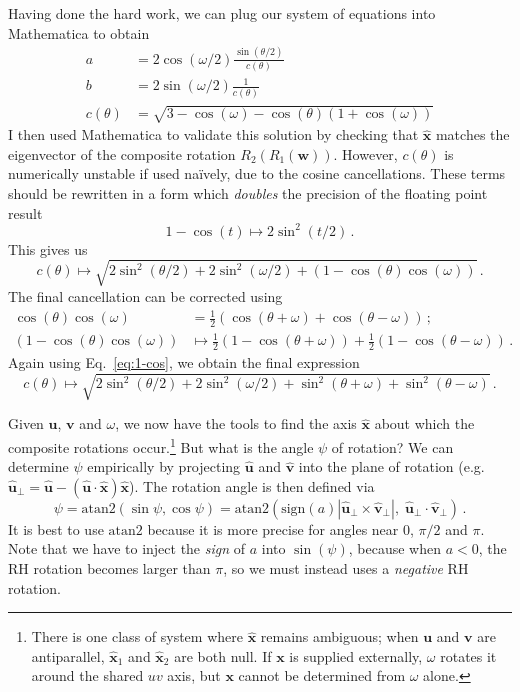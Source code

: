\documentclass{article}
\renewcommand{\vec}[1]{\boldsymbol{#1}}
\newcommand{\vecN}[1]{\vec{\hat{#1}}}
\newcommand{\ds}{^{}}
\newcommand{\abs}[1]{|#1|}
\newcommand{\ang}{\psi}
\newcommand{\vict}{\vec{w}}
\newcommand{\ax}{\vecN{x}}
\begin{document}
Having done the hard work, we can plug our system of equations into Mathematica to obtain
\begin{align}
	a & = 2\cos(\omega/2)\frac{\sin(\theta/2)}{c(\theta)}\\
	b & = 2\sin(\omega/2)\frac{1}{c(\theta)}\\
	c(\theta) & = \sqrt{3 - \cos(\omega) - \cos(\theta)(1+\cos(\omega))}
\end{align}
I then used Mathematica to validate this solution by checking that 
$\ax$ matches the eigenvector of the composite rotation $R_2\ds(R_1\ds(\vict))$.
However, $c(\theta)$ is numerically unstable if used na\"ively, 
due to the cosine cancellations. These terms should be rewritten 
in a form which \emph{doubles} the precision of the floating point result
\begin{equation}\label{eq:1-cos}
	1-\cos(t) \mapsto 2\sin^2(t/2)\,.
\end{equation}
This gives us
\begin{equation}
	c(\theta)\mapsto
	\sqrt{2\sin^2(\theta/2) + 2\sin^2(\omega/2) + (1 - \cos(\theta)\cos(\omega))}\,.
\end{equation}
The final cancellation can be corrected using
\begin{align}
	\cos(\theta)\cos(\omega) 
		& = \frac{1}{2}(\cos(\theta+\omega) + \cos(\theta-\omega))\,;\\
	(1 - \cos(\theta)\cos(\omega)) 
		&\mapsto \frac{1}{2}(1-\cos(\theta+\omega))
		 + \frac{1}{2}(1-\cos(\theta-\omega))\,.
\end{align}
Again using Eq.~\ref{eq:1-cos}, we obtain the final expression
\begin{equation}
	c(\theta)\mapsto
	\sqrt{2\sin^2(\theta/2) + 2\sin^2(\omega/2)	
	+ \sin^2(\theta+\omega) 
	+ \sin^2(\theta-\omega)}\,.
\end{equation}

Given $\vec{u}$, $\vec{v}$ and $\omega$, we now have the tools to find the axis $\ax$
about which the composite rotations occur.\footnote
{\nobreak
	There is one class of system where $\ax$ remains ambiguous;
	when $\vec{u}$ and $\vec{v}$ are antiparallel, 
	$\ax_1\ds$ and $\ax_2\ds$ are both null.
	If $\vec{x}$ is supplied externally, 
	$\omega$ rotates it around the shared $uv$ axis,
	but $\vec{x}$ cannot be determined from $\omega$ alone.
}
But what is the angle $\ang$ of rotation?
We can determine $\psi$ empirically by projecting 
$\vecN{u}$ and $\vecN{v}$ into the plane of rotation (e.g. 
$\vecN{u}_\bot\ds = \vecN{u} - (\vecN{u}\cdot\vecN{x}) \vecN{x}$).
The rotation angle is then defined via
\begin{equation}
	\psi = \text{atan2}(\sin\psi, \cos\psi)
		= \text{atan2}\left(\text{sign}(a)\abs{\vecN{u}_\bot\ds \times \vecN{v}_\bot\ds},\; 
		\vecN{u}_\bot\ds \cdot \vecN{v}_\bot\ds\right)\,.
\end{equation}
It is best to use $\text{atan2}$ because it is more precise
for angles near $0$, $\pi/2$ and $\pi$. Note that we have to 
inject the \emph{sign} of $a$ into $\sin(\psi)$, 
because when $a<0$, the RH rotation becomes larger than 
$\pi$, so we must instead uses a \emph{negative} RH rotation.
\end{document}
